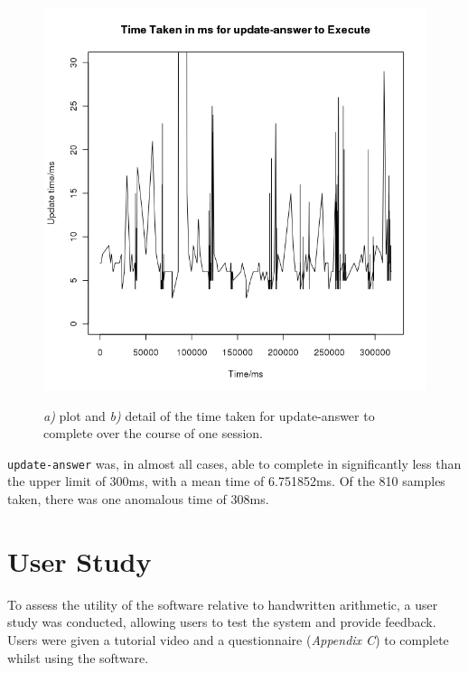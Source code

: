 \documentclass[12pt,twoside,notitlepage,xetex]{report}
\begin{document}
\begin{center}
\begin{figure}[H]
\begin{center}
{\includegraphics[width=\textwidth-2cm]{figs/graphs/update_times_cut30.png}
}
\end{center}
\caption{\emph{a)} plot and \emph{b)} detail of the time taken for {\ttfamily update-answer} to complete over the course of one session.}
\label{fig:UpdateTimes}
\end{figure}
\end{center}

\verb¬update-answer¬ was, in almost all cases, able to complete in significantly less than the upper limit of 300ms, with a mean time of 6.751852ms.  Of the 810 samples taken, there was one anomalous time of 308ms.

%
\section{User Study}

To assess the utility of the software relative to handwritten arithmetic, a user study was conducted, allowing users to test the system and provide feedback.  Users were given a tutorial video and a questionnaire (\emph{Appendix C}) to complete whilst using the software.
\end{document}
